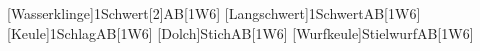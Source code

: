\documentclass{m5figur-mv}[2016/01/04]
\begin{document}
{%
%

[Wasserklinge]{1Schwert}[2]{AB}[1W6]
[Langschwert]{1Schwert}{AB}[1W6]
[Keule]{1Schlag}{AB}[1W6]
[Dolch]{Stich}{AB}[1W6]
[Wurfkeule]{Stielwurf}{AB}[1W6]

{ %




}}
\end{document}
